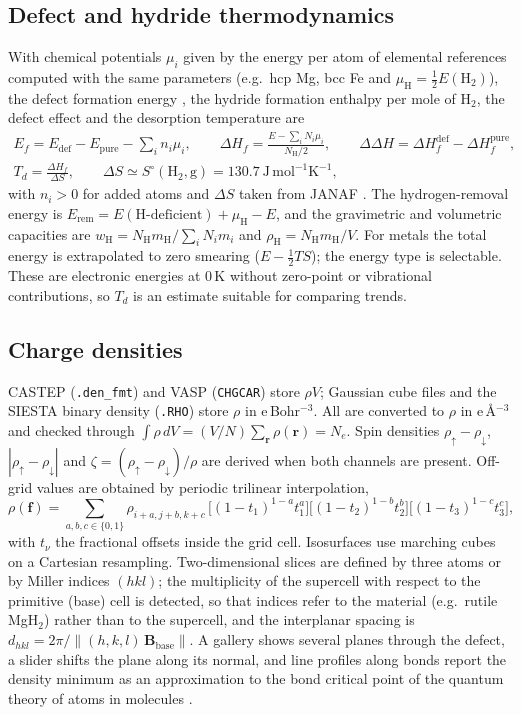 \documentclass[11pt,a4paper]{article}
\newcommand{\code}[1]{\texttt{#1}}
\begin{document}
\subsection{Defect and hydride thermodynamics}
With chemical potentials $\mu_i$ given by the energy per atom of elemental references computed with the same parameters (e.g.\ hcp Mg, bcc Fe and $\mu_\mathrm{H}=\tfrac12E(\mathrm H_2)$), the defect formation energy \cite{freysoldt2014,vandewalle2004}, the hydride formation enthalpy per mole of H$_2$, the defect effect and the desorption temperature are
\begin{gather}
E_f=E_\mathrm{def}-E_\mathrm{pure}-\sum_i n_i\mu_i,\qquad
\Delta H_f=\frac{E-\sum_iN_i\mu_i}{N_\mathrm H/2},\qquad
\Delta\Delta H=\Delta H_f^\mathrm{def}-\Delta H_f^\mathrm{pure},\\
T_d=\frac{\Delta H_f}{\Delta S},\qquad \Delta S\simeq S^\circ(\mathrm H_2,\mathrm g)=130.7\ \mathrm{J\,mol^{-1}K^{-1}},
\end{gather}
with $n_i>0$ for added atoms and $\Delta S$ taken from JANAF \cite{chase1998janaf}. The hydrogen-removal energy is $E_\mathrm{rem}=E(\text{H-deficient})+\mu_\mathrm H-E$, and the gravimetric and volumetric capacities are $w_\mathrm H=N_\mathrm H m_\mathrm H/\sum_iN_im_i$ and $\rho_\mathrm H=N_\mathrm H m_\mathrm H/V$. For metals the total energy is extrapolated to zero smearing ($E-\tfrac12TS$); the energy type is selectable. These are electronic energies at 0\,K without zero-point or vibrational contributions, so $T_d$ is an estimate suitable for comparing trends.

\subsection{Charge densities}
CASTEP (\code{.den\_fmt}) and VASP (\code{CHGCAR}) store $\rho V$; Gaussian cube files and the SIESTA binary density (\code{.RHO}) store $\rho$ in e\,Bohr$^{-3}$. All are converted to $\rho$ in e\,\AA$^{-3}$ and checked through $\int\rho\,dV=(V/N)\sum_{\mathbf r}\rho(\mathbf r)=N_e$. Spin densities $\rho_\uparrow-\rho_\downarrow$, $|\rho_\uparrow-\rho_\downarrow|$ and $\zeta=(\rho_\uparrow-\rho_\downarrow)/\rho$ are derived when both channels are present. Off-grid values are obtained by periodic trilinear interpolation,
\begin{equation}
\rho(\mathbf f)=\sum_{a,b,c\in\{0,1\}}\rho_{i+a,j+b,k+c}\,\big[(1-t_1)^{1-a}t_1^{a}\big]\big[(1-t_2)^{1-b}t_2^{b}\big]\big[(1-t_3)^{1-c}t_3^{c}\big],
\end{equation}
with $t_\nu$ the fractional offsets inside the grid cell. Isosurfaces use marching cubes \cite{lorensen1987} on a Cartesian resampling. Two-dimensional slices are defined by three atoms or by Miller indices $(hkl)$; the multiplicity of the supercell with respect to the primitive (base) cell is detected, so that indices refer to the material (e.g.\ rutile MgH$_2$) rather than to the supercell, and the interplanar spacing is $d_{hkl}=2\pi/\lVert(h,k,l)\,\mathbf B_\mathrm{base}\rVert$. A gallery shows several planes through the defect, a slider shifts the plane along its normal, and line profiles along bonds report the density minimum as an approximation to the bond critical point of the quantum theory of atoms in molecules \cite{bader1990}.
\end{document}
